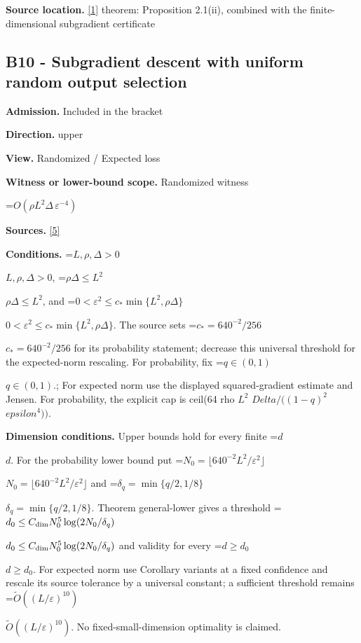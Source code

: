 \documentclass[10pt,a4paper]{article}
\newcommand{\AtlasMath}[1]{\par\begingroup\centering\setbox0=\hbox{$\displaystyle #1$}\ifdim\wd0>1.4\linewidth\typeout{ATLAS WIDE FORMULA: \the\wd0}\fi\ifdim\wd0>\linewidth\resizebox{\linewidth}{!}{\box0}\else\box0\fi\par\endgroup}
\newcommand{\AtlasInlineMath}[1]{\begingroup\setbox0=\hbox{$#1$}\ifdim\wd0>.4\linewidth\endgroup\AtlasMath{#1}\else\endgroup$#1$\fi}
\begin{document}
\textbf{Source location.} \href{https://www2.isye.gatech.edu/~nemirovs/MOR_AccuracyCertificates.pdf}{[1]} theorem: Proposition 2.1(ii), combined with the finite-dimensional subgradient certificate



\subsection{B10 - Subgradient descent with uniform random output selection}


\textbf{Admission.} Included in the bracket



\textbf{Direction.} upper



\textbf{View.} Randomized / Expected loss



\textbf{Witness or lower-bound scope.} Randomized witness



\AtlasMath{O(\rho L^2\Delta\,\varepsilon^{-4})}


\textbf{Sources.} \href{https://github.com/WU-Wendao/Colombo/blob/main/colombo_sensorium/Complexity_altas/data/sources/colombo/N01/manuscript.pdf}{[5]}



\textbf{Conditions.} \AtlasInlineMath{L,\rho,\Delta>0}, \AtlasInlineMath{\rho\Delta\le L^2}, and \AtlasInlineMath{0<\varepsilon^2\le c_*\min\{L^2,\rho\Delta\}}. The source sets \AtlasInlineMath{c_*=640^{-2}/256} for its probability statement; decrease this universal threshold for the expected-norm rescaling. For probability, fix \AtlasInlineMath{q\in(0,1)}.; For expected norm use the displayed squared-gradient estimate and Jensen. For probability, the explicit cap is ceil(64 rho $L^2$ $Delta/((1-q)^2$ $epsilon^4))$.



\textbf{Dimension conditions.} Upper bounds hold for every finite \AtlasInlineMath{d}. For the probability lower bound put \AtlasInlineMath{N_0=\lfloor640^{-2}L^2/\varepsilon^2\rfloor} and \AtlasInlineMath{\delta_q=\min\{q/2,1/8\}}. Theorem general-lower gives a threshold \AtlasInlineMath{d_0\le C_{\rm dim}N_0^5\log(2N_0/\delta_q)} and validity for every \AtlasInlineMath{d\ge d_0}. For expected norm use Corollary variants at a fixed confidence and rescale its source tolerance by a universal constant; a sufficient threshold remains \AtlasInlineMath{\widetilde O((L/\varepsilon)^{10})}. No fixed-small-dimension optimality is claimed.
\end{document}
